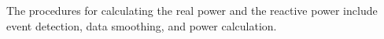 \documentclass[conference]{IEEEtran}
\begin{document}
The procedures for calculating the real power and the reactive power include event detection, data smoothing, and power calculation.




%
%



%
%
\end{document}

